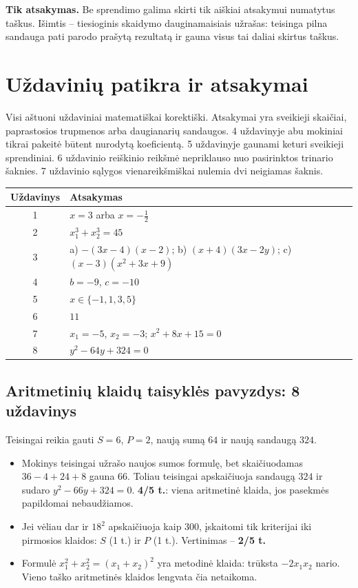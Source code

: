 \documentclass[11pt,a4paper]{article}
\begin{document}
\textbf{Tik atsakymas.} Be sprendimo galima skirti tik aiškiai atsakymui numatytus taškus. Išimtis -- tiesioginis skaidymo dauginamaisiais užrašas: teisinga pilna sandauga pati parodo prašytą rezultatą ir gauna visus tai daliai skirtus taškus.



\newpage
\section*{Uždavinių patikra ir atsakymai}
Visi aštuoni uždaviniai matematiškai korektiški. Atsakymai yra sveikieji skaičiai, paprastosios trupmenos arba daugianarių sandaugos. 4 uždavinyje abu mokiniai tikrai pakeitė būtent nurodytą koeficientą. 5 uždavinyje gaunami keturi sveikieji sprendiniai. 6 uždavinio reiškinio reikšmė nepriklauso nuo pasirinktos trinario šaknies. 7 uždavinio sąlygos vienareikšmiškai nulemia dvi neigiamas šaknis.

\begin{center}\small\renewcommand{\arraystretch}{1.25}
\begin{tabularx}{\linewidth}{|c|X|}\hline
\textbf{Uždavinys}&\textbf{Atsakymas}\\\hline
1&$x=3$ arba $x=-\frac12$\\\hline
2&$x_1^3+x_2^3=45$\\\hline
3&a) $-(3x-4)(x-2)$; b) $(x+4)(3x-2y)$; c) $(x-3)(x^2+3x+9)$\\\hline
4&$b=-9$, $c=-10$\\\hline
5&$x\in\{-1,1,3,5\}$\\\hline
6&$11$\\\hline
7&$x_1=-5$, $x_2=-3$; $x^2+8x+15=0$\\\hline
8&$y^2-64y+324=0$\\\hline
\end{tabularx}\end{center}

\subsection*{Aritmetinių klaidų taisyklės pavyzdys: 8 uždavinys}
Teisingai reikia gauti $S=6$, $P=2$, naują sumą $64$ ir naują sandaugą $324$.
\begin{itemize}
\item Mokinys teisingai užrašo naujos sumos formulę, bet skaičiuodamas $36-4+24+8$ gauna $66$. Toliau teisingai apskaičiuoja sandaugą $324$ ir sudaro $y^2-66y+324=0$. \textbf{4/5 t.}: viena aritmetinė klaida, jos pasekmės papildomai nebaudžiamos.
\item Jei vėliau dar ir $18^2$ apskaičiuoja kaip $300$, įskaitomi tik kriterijai iki pirmosios klaidos: $S$ (1 t.) ir $P$ (1 t.). Vertinimas -- \textbf{2/5 t.}
\item Formulė $x_1^2+x_2^2=(x_1+x_2)^2$ yra metodinė klaida: trūksta $-2x_1x_2$ nario. Vieno taško aritmetinės klaidos lengvata čia netaikoma.
\end{itemize}
\end{document}
